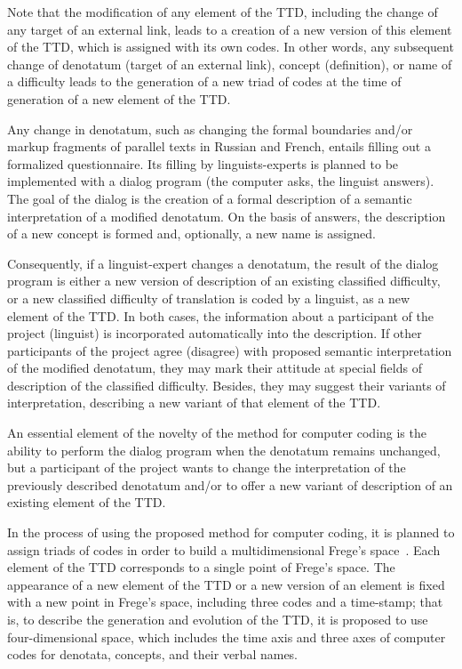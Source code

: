 \begin{multicols}{2}
   Note that the modification of any element of the TTD, including the change of any target of 
an external link, leads to a creation of a new version of this element of the TTD, which is 
assigned with its own codes. In other words, any subsequent change of denotatum (target of an 
external link), concept (definition), or name of a difficulty leads to the generation of a new triad 
of codes at the time of generation of a new element of the TTD.
   
   Any change in denotatum, such as changing the formal boundaries and/or markup fragments 
of parallel texts in Russian and French, entails filling out a formalized questionnaire. Its filling 
by linguists-experts is planned to be implemented with a dialog program (the computer asks, the 
linguist answers). The goal of the dialog is the creation of a formal description of a semantic 
interpretation of a modified denotatum. On the basis of answers, the description of a new concept 
is formed and, optionally, a new name is assigned.
   
   Consequently, if a linguist-expert changes a denotatum, the result of the dialog program is 
either a new version of description of an existing classified difficulty, or a new classified 
difficulty of translation is coded by a linguist, as a new element of the TTD. In both cases, the 
information about a participant of the project (linguist) is incorporated automatically into the 
description. If other participants of the project agree (disagree) with proposed semantic 
interpretation of the modified denotatum, they may mark their attitude at special fields of 
description of the classified difficulty. Besides, they may suggest their variants of interpretation, 
describing a new variant of that element of the TTD.
   
   An essential element of the novelty of the method for computer coding is the ability to 
perform the dialog program when the denotatum remains unchanged, but a participant of the 
project wants to change the interpretation of the previously described denotatum and/or to offer a 
new variant of description of an existing element of the TTD.
   
   In the process of using the proposed method for computer coding, it is planned to assign triads 
of codes in order to build a multidimensional Frege's space~\cite{1bun}. Each element of the 
TTD corresponds to a single point of Frege's space. The appearance of a new element of the 
TTD or a new version of an element is fixed with a new point in Frege's space, including three 
codes and a time-stamp; that is, to describe the generation and evolution of the TTD, it is 
proposed to use four-dimensional space, which includes the time axis and three axes of computer 
codes for denotata, concepts, and their verbal names.
   

\end{multicols}
